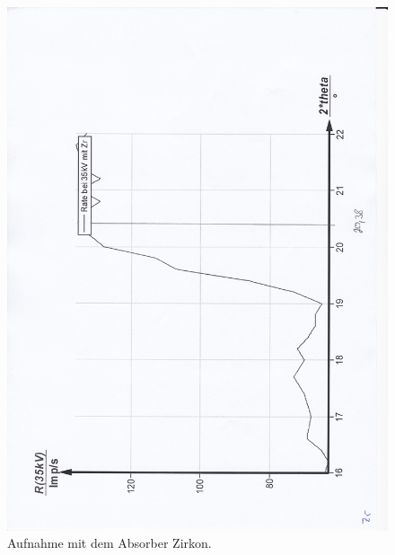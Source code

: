 \begin{figure}[p]
  \centering
  \includegraphics[width=\textwidth]{content/Zirkon.jpg}
  \caption{Aufnahme mit dem Absorber Zirkon.}
  \label{Bild:5}
\end{figure}
